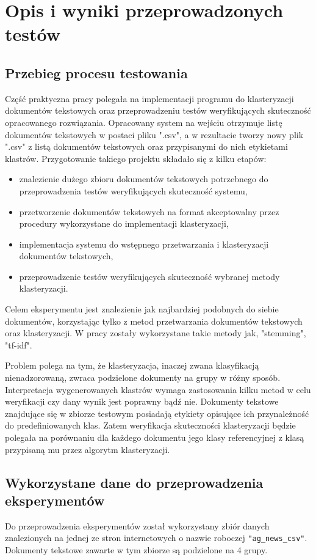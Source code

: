 \chapter{Opis i wyniki przeprowadzonych testów}

\section{Przebieg procesu testowania}
Część praktyczna pracy polegała na implementacji programu do klasteryzacji dokumentów tekstowych oraz przeprowadzeniu testów weryfikujących skuteczność opracowanego rozwiązania. Opracowany system na wejściu otrzymuje listę dokumentów tekstowych w postaci pliku ".csv", a w rezultacie tworzy nowy plik ".csv" z listą dokumentów tekstowych oraz przypisanymi do nich etykietami klastrów. Przygotowanie takiego projektu składało się z kilku etapów:
\begin{itemize}
    \item znalezienie dużego zbioru dokumentów tekstowych potrzebnego do przeprowadzenia testów weryfikujących skuteczność systemu,
    \item przetworzenie dokumentów tekstowych na format akceptowalny przez procedury wykorzystane do implementacji klasteryzacji,
    \item implementacja systemu do wstępnego przetwarzania i klasteryzacji dokumentów tekstowych,
    \item przeprowadzenie testów weryfikujących skuteczność wybranej metody klasteryzacji.
\end{itemize}
\newpage

Celem eksperymentu jest znalezienie jak najbardziej podobnych do siebie dokumentów, korzystając tylko z metod przetwarzania dokumentów tekstowych oraz klasteryzacji. W pracy zostały wykorzystane takie metody jak, "stemming", "tf-idf".

Problem polega na tym, że klasteryzacja, inaczej zwana klasyfikacją nienadzorowaną, zwraca podzielone dokumenty na grupy w różny sposób. Interpretacja wygenerowanych klastrów wymaga zastosowania kilku metod w celu weryfikacji czy dany wynik jest poprawny bądź nie. Dokumenty tekstowe znajdujące się w zbiorze testowym posiadają etykiety opisujące ich przynależność do predefiniowanych klas. Zatem weryfikacja skuteczności klasteryzacji będzie polegała na porównaniu dla każdego dokumentu jego klasy referencyjnej z klasą przypisaną mu przez algorytm klasteryzacji.

\section{Wykorzystane dane do przeprowadzenia eksperymentów}
Do przeprowadzenia eksperymentów został wykorzystany zbiór danych znalezionych na jednej ze stron internetowych \cite{datasetclass} o nazwie roboczej \texttt{"ag\_news\_csv"}. Dokumenty tekstowe zawarte w tym zbiorze są podzielone na 4 grupy.

